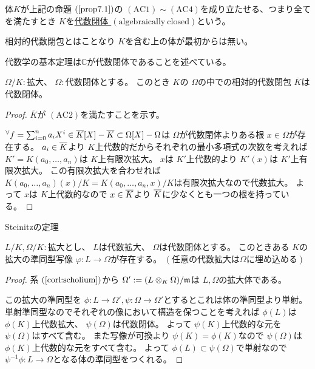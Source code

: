 \documentclass[../master_galois_theory]{subfiles}
\begin{document}
\begin{defi}
  体$K$が上記の命題 $(\mathrm{\ref{prop7.1}})$の $(\mathrm{AC}1) \sim (\mathrm{AC}4)$を成り立たせる、つまり全てを満たすとき
  $K$を\underline{代数閉体 $(\mathrm{algebraically \  closed})$}という。

  相対的代数閉包とはことなり $K$を含む上の体が最初からは無い。
\end{defi}

\begin{exam}
  代数学の基本定理は$\mathbb{C}$が代数閉体であることを述べている。
\end{exam}

\begin{prop}
  $\Omega/K:$拡大、 $\Omega :$代数閉体とする。
  このとき $K$の $\Omega$の中での相対的代数閉包 $\overline{K}$は代数閉体。
\end{prop}

\begin{proof}
  $\overline{K}$が $(\mathrm{AC}2)$を満たすことを示す。

  ${}^\forall f = \sum_{i=0}^n a_i X^i \in \overline{K}[X] - \overline{K} \subset \Omega[X] - \Omega$は
  $\Omega$が代数閉体よりある根 $x \in \Omega$が存在する。
  $a_i \in \overline{K}$より $K$上代数的だからそれぞれの最小多項式の次数を考えれば
  $K' = K(a_0 , \dots , a_n)$は $K$上有限次拡大。
  $x$は $K'$上代数的より
  $K'(x)$は $K'$上有限次拡大。
  この有限次拡大を合わせれば $K(a_0 , \dots , a_n)(x)/K = K(a_0 , \dots , a_n , x)/K$は有限次拡大なので代数拡大。
  よって $x$は $K$上代数的なので $x \in \overline{K}$より $\overline{K}$に少なくとも一つの根を持っている。
\end{proof}

\begin{theo} \label{theo:7.3}
  \rm{Steinitz}の定理

  $L/K , \Omega/K:$拡大とし、 $L$は代数拡大、 $\Omega$は代数閉体とする。
  このときある $K$の拡大の準同型写像 $\varphi : L \longrightarrow \Omega$が存在する。
  $(任意の代数拡大は \Omega に埋め込める)$
\end{theo}

\begin{proof}
  系 $(\mathrm{\ref{corl:scholium}})$から $\Omega' := (L \otimes_K \Omega)/\mathfrak{m}$は $L , \Omega$の拡大体である。

  この拡大の準同型を $\phi : L \longrightarrow \Omega' , \psi : \Omega \longrightarrow \Omega'$とするとこれは体の準同型より単射。
  単射準同型なのでそれぞれの像において構造を保つことを考えれば
  $\phi(L)$は $\phi(K)$上代数拡大、 $\psi(\Omega)$は代数閉体。
  よって $\psi(K)$上代数的な元を $\psi(\Omega)$はすべて含む。
  また写像が可換より $\psi(K) = \phi(K)$なので
  $\psi(\Omega)$は $\phi(K)$上代数的な元をすべて含む。
  よって $\phi(L) \subset \psi(\Omega)$で単射なので
  $\psi^{-1}\phi : L \longrightarrow \Omega$となる体の準同型をつくれる。
\end{proof}
\end{document}
